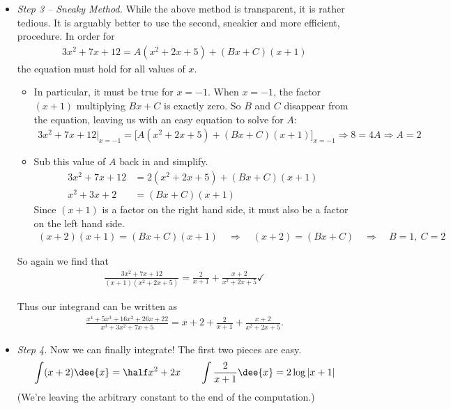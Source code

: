 \begin{eg}
\begin{itemize}
\item \emph{Step 3 -- Sneaky Method.} While the above method is transparent, it is rather
tedious. It is arguably better to use the second, sneakier and more efficient, procedure.
In order for
\begin{align*}
3x^2+7x+12=A(x^2+2x+5)+(Bx+C)(x+1)
\end{align*}
the equation must hold for all values of $x$.
\begin{itemize}
 \item In particular, it must be true for $x=-1$. When $x=-1$, the factor $(x+1)$
multiplying $Bx+C$ is exactly zero. So $B$ and $C$ disappear from the equation,
leaving us with an easy equation to solve for $A$:
\begin{align*}
3x^2+7x+12\Big|_{x=-1}=\Big[A(x^2+2x+5)+(Bx+C)(x+1)\Big]_{x=-1}
\Longrightarrow 8=4A\Longrightarrow A=2
\end{align*}
\item Sub this value of $A$ back in and simplify.
\begin{align*}
3x^2+7x+12&=2(x^2+2x+5)+(Bx+C)(x+1)\\
x^2+3x+2&=(Bx+C)(x+1)
\end{align*}
Since $(x+1)$ is a factor on the right hand side, it must also be a factor
on the left hand side.
\begin{align*}
(x+2)(x+1)=(Bx+C)(x+1)\quad\Rightarrow\quad (x+2)=(Bx+C)
\quad\Rightarrow\quad  B=1,\ C=2
\end{align*}
\end{itemize}
So again we find that
\begin{align*}
\frac{3x^2+7x+12}{(x+1)(x^2+2x+5)}
=\frac{2}{x+1}+\frac{x+2}{x^2+2x+5} \checkmark
\end{align*}

Thus our integrand can be written as
\begin{align*}
\frac{x^4+5x^3+16x^2+26x+22}{x^3+3x^2+7x+5}
=x+2+\frac{2}{x+1}+\frac{x+2}{x^2+2x+5}.
\end{align*}

\item \emph{Step 4.} Now we can finally integrate! The first two pieces are
easy.
\begin{align*}
\int (x+2)\dee{x} = \half x^2+2x
\qquad
\int \frac{2}{x+1}\dee{x} = 2\log|x+1|
\end{align*}
(We're leaving the arbitrary constant to the end of the computation.)


\end{itemize}
\end{eg}

